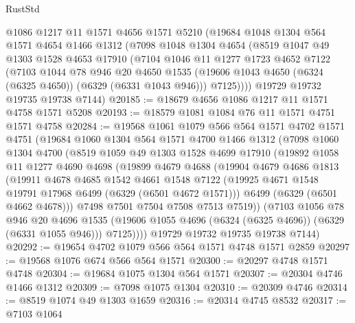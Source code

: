 \begin{lexlean}{RustStd}
\begin{coremodule}
{{    @1086
    @1217
    @11
    @1571
    @4656
    @1571
    @5210
    (@19684
      @1048
      @1304
      @564
      @1571
      @4654
      @1466
      @1312
      (@7098
        @1048
        @1304
        @4654
        (@8519
          @1047
          @49
          @1303
          @1528
          @4653
          @17910
          (@7104
            @1046
            @11
            @1277
            @1723
            @4652
            @7122
            (@7103
              @1044
              @78
              @946
              @20
              @4650
              @1535
              (@19606 @1043 @4650 (@6324 (@6325 @4650)) (@6329 (@6331 @1043 @946)))
              @7125))))
      @19729
      @19732
      @19735
      @19738
      @7144)
@20185 := @18679 @4656 @1086 @1217 @11 @1571 @4758 @1571 @5208
@20193 := @18579 @1081 @1084 @76 @11 @1571 @4751 @1571 @4758
@20284 := @19568
    @1061
    @1079
    @566
    @564
    @1571
    @4702
    @1571
    @4751
    (@19684
      @1060
      @1304
      @564
      @1571
      @4700
      @1466
      @1312
      (@7098
        @1060
        @1304
        @4700
        (@8519
          @1059
          @49
          @1303
          @1528
          @4699
          @17910
          (@19892
            @1058
            @11
            @1277
            @4690
            @4698
            (@19899
              @4679
              @4688
              (@19904
                @4679
                @4686
                @1813
                (@19911
                  @4678
                  @4685
                  @1542
                  @4661
                  @1548
                  @7122
                  (@19925 @4671 @1548 @19791 @17968 @6499 (@6329 (@6501 @4672 @1571)))
                  @6499
                  (@6329 (@6501 @4662 @4678)))
                @7498
                @7501
                @7504
                @7508
                @7513
                @7519))
            (@7103
              @1056
              @78
              @946
              @20
              @4696
              @1535
              (@19606 @1055 @4696 (@6324 (@6325 @4696)) (@6329 (@6331 @1055 @946)))
              @7125))))
      @19729
      @19732
      @19735
      @19738
      @7144)
@20292 := @19654 @4702 @1079 @566 @564 @1571 @4748 @1571 @2859
@20297 := @19568 @1076 @674 @566 @564 @1571
@20300 := @20297 @4748 @1571 @4748
@20304 := @19684 @1075 @1304 @564 @1571
@20307 := @20304 @4746 @1466 @1312
@20309 := @7098 @1075 @1304
@20310 := @20309 @4746
@20314 := @8519 @1074 @49 @1303 @1659
@20316 := @20314 @4745 @8532
@20317 := @7103 @1064
}}
\end{coremodule}
\end{lexlean}
